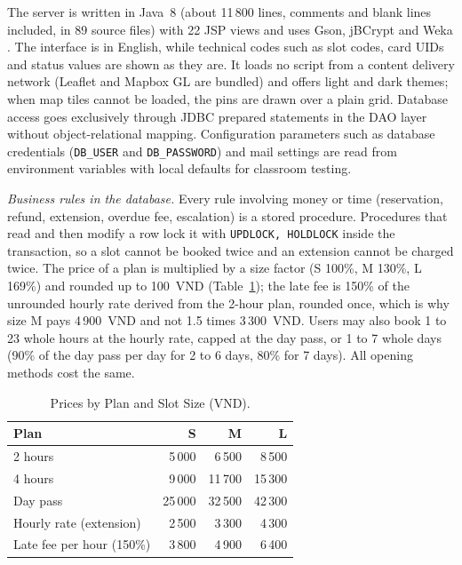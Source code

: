 \documentclass[journal,onecolumn]{IEEEtran}
\begin{document}
The server is written in Java~8 (about 11\,800 lines, comments and blank lines included, in 89 source files) with
22 JSP views and uses Gson, jBCrypt \cite{provos1999bcrypt} and Weka \cite{hall2009weka}. The interface is in English,
while technical codes such as slot codes, card UIDs and status values are shown as they are. It loads no script from a
content delivery network (Leaflet and Mapbox GL are bundled) and offers light and dark themes; when map tiles cannot be
loaded, the pins are drawn over a plain grid. Database access goes exclusively through JDBC prepared statements in the
DAO layer without object-relational mapping. Configuration parameters such as database credentials (\texttt{DB\_USER}
and \texttt{DB\_PASSWORD}) and mail settings are read from environment variables with local defaults for classroom
testing.

\textit{Business rules in the database.} Every rule involving money or time (reservation, refund, extension,
overdue fee, escalation) is a stored procedure. Procedures that read and then modify a row lock it with
\texttt{UPDLOCK, HOLDLOCK} inside the transaction, so a slot cannot be booked twice and an extension cannot be charged
twice. The price of a plan is multiplied by a size factor (S 100\%, M 130\%, L 169\%) and rounded up to 100~VND
(Table~\ref{tab:price}); the late fee is 150\% of the unrounded hourly rate derived from the 2-hour plan, rounded once,
which is why size M pays 4\,900~VND and not 1.5 times 3\,300~VND. Users may also book 1 to 23 whole hours at the hourly
rate, capped at the day pass, or 1 to 7 whole days (90\% of the day pass per day for 2 to 6 days, 80\% for 7 days).
All opening methods cost the same.

\begin{table}[!htbp]
\renewcommand{\arraystretch}{1.02}
\centering
\small
\caption{Prices by Plan and Slot Size (VND).}
\label{tab:price}
\vspace{5pt}
\begin{tabular}{l r r r}
\hline
Plan & S & M & L \\
\hline
\rule{0pt}{2.6ex}2 hours & 5\,000 & 6\,500 & 8\,500 \\
4 hours & 9\,000 & 11\,700 & 15\,300 \\
Day pass & 25\,000 & 32\,500 & 42\,300 \\
Hourly rate (extension) & 2\,500 & 3\,300 & 4\,300 \\
Late fee per hour (150\%) & 3\,800 & 4\,900 & 6\,400 \\
\hline
\end{tabular}
\end{table}
\end{document}

